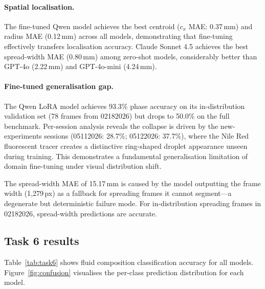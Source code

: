 \documentclass[10pt,twocolumn,letterpaper]{article}
\begin{document}
\paragraph{Spatial localisation.}
The fine-tuned Qwen model achieves the best centroid ($c_x$ MAE: 0.37\,mm)
and radius MAE (0.12\,mm) across all models, demonstrating that fine-tuning
effectively transfers localisation accuracy.
Claude Sonnet 4.5 achieves the best spread-width MAE (0.80\,mm) among
zero-shot models, considerably better than GPT-4o (2.22\,mm) and
GPT-4o-mini (4.24\,mm).

\paragraph{Fine-tuned generalisation gap.}
The Qwen LoRA model achieves 93.3\% phase accuracy on its in-distribution
validation set (78 frames from 02182026) but drops to 50.0\% on the full
benchmark.
Per-session analysis reveals the collapse is driven by the new-experiments
sessions (05112026: 28.7\%; 05122026: 37.7\%), where the Nile Red fluorescent
tracer creates a distinctive ring-shaped droplet appearance unseen during
training.
This demonstrates a fundamental generalisation limitation of domain fine-tuning
under visual distribution shift.

The spread-width MAE of 15.17\,mm is caused by the model outputting the frame
width (1{,}279\,px) as a fallback for spreading frames it cannot segment—a
degenerate but deterministic failure mode. For in-distribution spreading frames
in 02182026, spread-width predictions are accurate.

\subsection{Task 6 results}
\label{sec:results6}

Table~\ref{tab:task6} shows fluid composition classification accuracy for all
models. Figure~\ref{fig:confusion} visualises the per-class prediction
distribution for each model.
\end{document}
